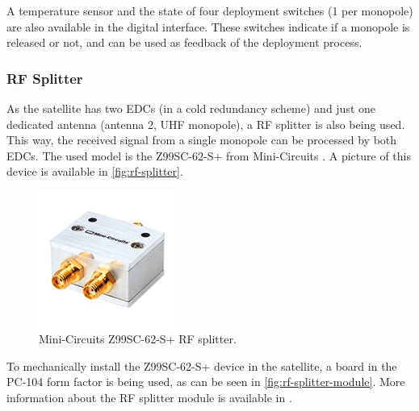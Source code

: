 A temperature sensor and the state of four deployment switches (1 per monopole) are also available in the digital interface. These switches indicate if a monopole is released or not, and can be used as feedback of the deployment process.

\subsubsection{RF Splitter}

As the satellite has two EDCs (in a cold redundancy scheme) and just one dedicated antenna (antenna 2, UHF monopole), a RF splitter is also being used. This way, the received signal from a single monopole can be processed by both EDCs. The used model is the Z99SC-62-S+ from Mini-Circuits \cite{z99sc-62-s}. A picture of this device is available in \autoref{fig:rf-splitter}.

\begin{figure}[!ht]
    \begin{center}
        \includegraphics[width=0.4\textwidth]{figures/z99sc-62-s}
        \caption{Mini-Circuits Z99SC-62-S+ RF splitter.}
        \label{fig:rf-splitter}
    \end{center}
\end{figure}

To mechanically install the Z99SC-62-S+ device in the satellite, a board in the PC-104 form factor is being used, as can be seen in \autoref{fig:rf-splitter-module}. More information about the RF splitter module is available in \cite{rf-splitter}.

